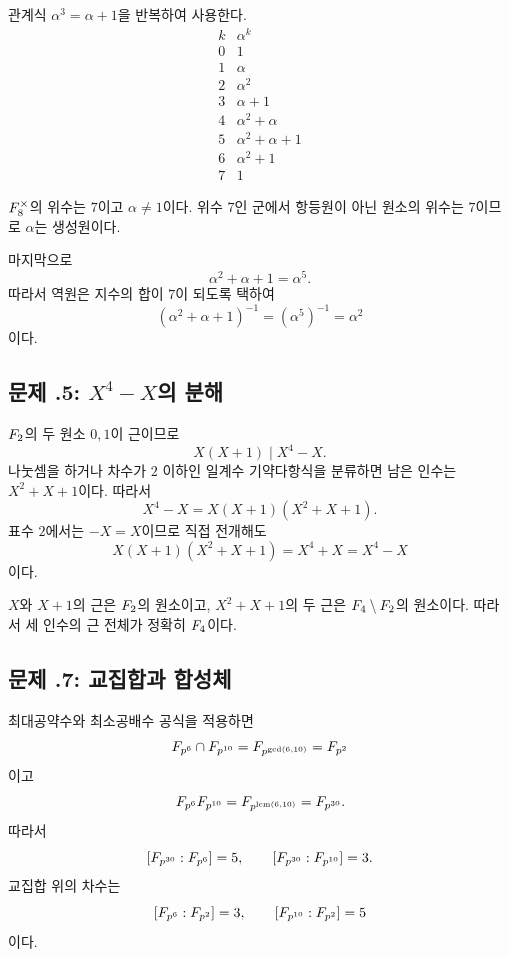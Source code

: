 \begin{solution}
관계식 $\alpha^3=\alpha+1$을 반복하여 사용한다.
\[
\begin{array}{c|c}
 k&\alpha^k\\
\hline
0&1\\
1&\alpha\\
2&\alpha^2\\
3&\alpha+1\\
4&\alpha^2+\alpha\\
5&\alpha^2+\alpha+1\\
6&\alpha^2+1\\
7&1
\end{array}
\]

$F_8^\times$의 위수는 $7$이고 $\alpha\ne1$이다. 위수 $7$인 군에서 항등원이 아닌 원소의 위수는 $7$이므로 $\alpha$는 생성원이다.

마지막으로
\[
  \alpha^2+\alpha+1=\alpha^5.
\]
따라서 역원은 지수의 합이 $7$이 되도록 택하여
\[
  (\alpha^2+\alpha+1)^{-1}
  =(\alpha^5)^{-1}=\alpha^2
\]
이다.
\end{solution}

\subsection*{문제 \thechapter.5: $X^4-X$의 분해}

\begin{solution}
$F_2$의 두 원소 $0,1$이 근이므로
\[
  X(X+1)\mid X^4-X.
\]
나눗셈을 하거나 차수가 $2$ 이하인 일계수 기약다항식을 분류하면 남은 인수는 $X^2+X+1$이다. 따라서
\[
  X^4-X=X(X+1)(X^2+X+1).
\]
표수 $2$에서는 $-X=X$이므로 직접 전개해도
\[
  X(X+1)(X^2+X+1)=X^4+X=X^4-X
\]
이다.

$X$와 $X+1$의 근은 $F_2$의 원소이고, $X^2+X+1$의 두 근은 $F_4\setminus F_2$의 원소이다. 따라서 세 인수의 근 전체가 정확히 $F_4$이다.
\end{solution}

\subsection*{문제 \thechapter.7: 교집합과 합성체}

\begin{solution}
최대공약수와 최소공배수 공식을 적용하면
\[
  F_{p^6}\cap F_{p^{10}}
  =F_{p^{\gcd(6,10)}}=F_{p^2}
\]
이고
\[
  F_{p^6}F_{p^{10}}
  =F_{p^{\operatorname{lcm}(6,10)}}=F_{p^{30}}.
\]
따라서
\[
  [F_{p^{30}}:F_{p^6}]=5,
  \qquad
  [F_{p^{30}}:F_{p^{10}}]=3.
\]
교집합 위의 차수는
\[
  [F_{p^6}:F_{p^2}]=3,
  \qquad
  [F_{p^{10}}:F_{p^2}]=5
\]
이다.
\end{solution}

